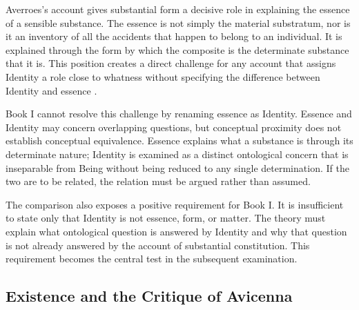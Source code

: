 \label{para:VS.B01.P01.C08.S15.SS07.P002}

Averroes's account gives substantial form a decisive role
in explaining the essence of a sensible substance.
The essence is not simply the material substratum, nor
is it an inventory of all the accidents that happen to
belong to an individual. It is explained through the
form by which the composite is the determinate substance
that it is. This position creates a direct challenge
for any account that assigns Identity a role close to
whatness without specifying the difference between
Identity and essence
\citep{AverroesLongCommentaryMetaphysicsBouyges1990,
DiGiovanniSubstantialFormAverroes2011}.

\label{para:VS.B01.P01.C08.S15.SS07.P003}

Book I cannot resolve this challenge by renaming essence
as Identity. Essence and Identity may concern overlapping
questions, but conceptual proximity does not establish
conceptual equivalence. Essence explains what a substance
is through its determinate nature; Identity is examined
as a distinct ontological concern that is inseparable
from Being without being reduced to any single determination.
If the two are to be related, the relation must be
argued rather than assumed.

\label{para:VS.B01.P01.C08.S15.SS07.P004}

The comparison also exposes a positive requirement for
Book I. It is insufficient to state only that Identity
is not essence, form, or matter. The theory must explain
what ontological question is answered by Identity and
why that question is not already answered by the account
of substantial constitution. This requirement becomes
the central test in the subsequent examination.



\subsection{Existence and the Critique of Avicenna}
\label{subsec:ch08_s15_ss08}

\label{para:VS.B01.P01.C08.S15.SS08.P001}

